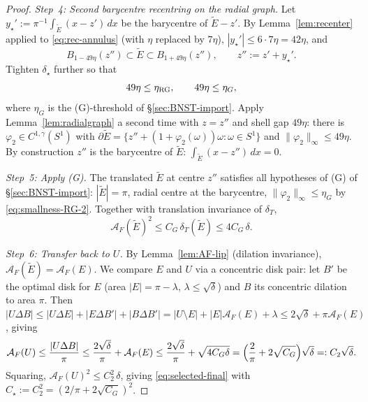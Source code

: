 \documentclass[11pt]{amsart}
\newcommand{\dT}{\delta_T}
\newcommand{\AF}{\mathcal A_F}
\newcommand{\Etil}{\widetilde E}
\begin{document}
\begin{proof}
\emph{Step~4: Second barycentre recentring on the radial graph.}
Let \(y_\star':=\pi^{-1}\int_{\Etil}(x-z')\,dx\) be the barycentre of
$\Etil-z'$.  By Lemma~\ref{lem:recenter} applied to
\eqref{eq:rec-annulus} (with $\eta$ replaced by $7\eta$),
\(|y_\star'|\le 6\cdot 7\eta=42\eta\), and
\begin{equation}\label{eq:rec-annulus-2}
   B_{1-49\eta}(z'')\subset\Etil\subset B_{1+49\eta}(z''),
   \qquad
   z'':=z'+y_\star'.
\end{equation}
Tighten $\delta_\star$ further so that
\begin{equation}\label{eq:smallness-RG-2}
   49\eta\le\eta_{\rm RG},
   \qquad
   49\eta\le\eta_G,
\end{equation}
where $\eta_G$ is the (G)-threshold of \S\ref{sec:BNST-import}.
Apply Lemma~\ref{lem:radialgraph} a second time with $z=z''$ and
shell gap $49\eta$: there is
$\varphi_2\in C^{1,\gamma}(S^{1})$ with
\(\partial\Etil=\{z''+(1+\varphi_2(\omega))\omega:\omega\in S^{1}\}\)
and $\|\varphi_2\|_\infty\le 49\eta$.  By construction $z''$ is the
barycentre of $\Etil$: \(\int_{\Etil}(x-z'')\,dx=0\).

\emph{Step~5: Apply (G).}  The translated $\Etil$ at centre $z''$
satisfies all hypotheses of (G) of \S\ref{sec:BNST-import}:
$|\Etil|=\pi$, radial centre at the barycentre,
$\|\varphi_2\|_\infty\le\eta_G$ by \eqref{eq:smallness-RG-2}.
Together with translation invariance of $\dT$,
\begin{equation}\label{eq:G-on-Etil}
   \AF(\Etil)^{2}\le C_G\,\dT(\Etil)\le 4 C_G\,\delta.
\end{equation}

\emph{Step~6: Transfer back to $U$.}  By
Lemma~\ref{lem:AF-lip} (dilation invariance), $\AF(\Etil)=\AF(E)$.
We compare $E$ and $U$ via a concentric disk pair: let $B'$ be the
optimal disk for $E$ (area $|E|=\pi-\lambda$, $\lambda\le\sqrt\delta$)
and $B$ its concentric dilation to area $\pi$.  Then
\(|U\Delta B|\le|U\Delta E|+|E\Delta B'|+|B\Delta B'|
   =|U\setminus E|+|E|\AF(E)+\lambda\le 2\sqrt\delta+\pi\AF(E)\),
giving
\begin{equation}\label{eq:transfer-U}
   \AF(U)
   \le\frac{|U\Delta B|}{\pi}
   \le\frac{2\sqrt\delta}{\pi}+\AF(E)
   \le\frac{2\sqrt\delta}{\pi}+\sqrt{4 C_G\delta}
   =\Bigl(\frac{2}{\pi}+2\sqrt{C_G}\Bigr)\sqrt\delta
   =:C_2\sqrt\delta.
\end{equation}
Squaring, \(\AF(U)^{2}\le C_2^{2}\,\delta\), giving
\eqref{eq:selected-final} with $C_\star:=C_2^{2}=(2/\pi+2\sqrt{C_G})
^{2}$.
\end{proof}
\end{document}
